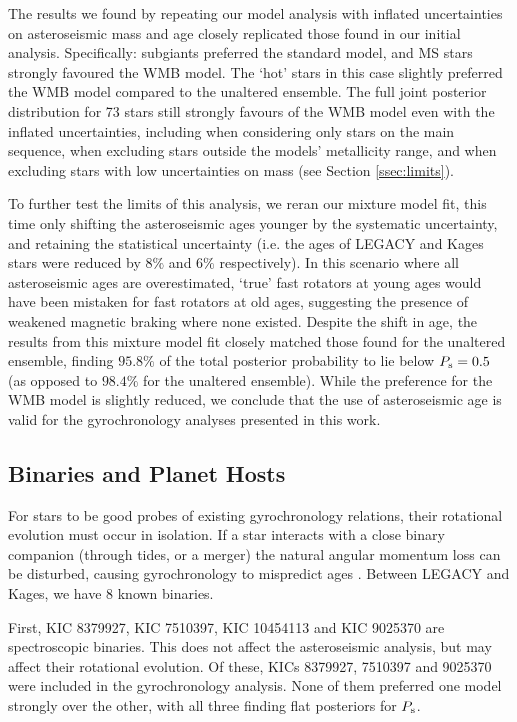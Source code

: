 The results we found by repeating our model analysis with inflated uncertainties on asteroseismic mass and age closely replicated those found in our initial analysis. Specifically: subgiants preferred the standard model, and MS stars strongly favoured the WMB model. The `hot' stars in this case slightly preferred the WMB model compared to the unaltered ensemble. The full joint posterior distribution for 73 stars still strongly favours of the WMB model even with the inflated uncertainties, including when considering only stars on the main sequence, when excluding stars outside the models' metallicity range, and when excluding stars with low uncertainties on mass (see Section \ref{ssec:limits}).

To further test the limits of this analysis, we reran our mixture model fit, this time only shifting the asteroseismic ages younger by the systematic uncertainty, and retaining the statistical uncertainty (i.e. the ages of LEGACY and Kages stars were reduced by $8\%$ and $6\%$ respectively). In this scenario where all asteroseismic ages are overestimated, `true' fast rotators at young ages would have been mistaken for fast rotators at old ages, suggesting the presence of weakened magnetic braking where none existed. Despite the shift in age, the results from this mixture model fit closely matched those found for the unaltered ensemble, finding $95.8\%$ of the total posterior probability to lie below $P_{\rm s} = 0.5$ (as opposed to $98.4\%$ for the unaltered ensemble). While the preference for the WMB model is slightly reduced, we conclude that the use of asteroseismic age is valid for the gyrochronology analyses presented in this work.

\subsection{Binaries and Planet Hosts}
For stars to be good probes of existing gyrochronology relations, their rotational evolution must occur in isolation. If a star interacts with a close binary companion (through tides, or a merger) the natural angular momentum loss can be disturbed, causing gyrochronology to mispredict ages \cite{leiner+2019, fleming+2019}. Between LEGACY and Kages, we have 8 known binaries. 

First, KIC 8379927, KIC 7510397, KIC 10454113 and KIC 9025370 are spectroscopic binaries. This does not affect the asteroseismic analysis, but may affect their rotational evolution. Of these, KICs 8379927, 7510397 and 9025370 were included in the gyrochronology analysis. None of them preferred one model strongly over the other, with all three finding flat posteriors for $P_{\rm s}$.

